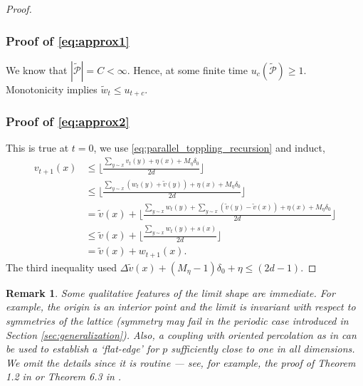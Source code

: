 \documentclass[aap]{imsart}
\newtheorem{remark}{Remark}
\begin{document}
\begin{proof}
	
	\subsubsection*{Proof of \eqref{eq:approx1}}
	We know that $|\tilde{\mathcal{P}}| = C < \infty$. Hence, at some finite time 
	$u_{c}(\tilde{\mathcal{P}}) \geq 1$. Monotonicity implies $\tilde{w}_t \leq u_{t + c}$.
	
	\subsubsection*{Proof of \eqref{eq:approx2}}
	This is true at $t = 0$, we use \eqref{eq:parallel_toppling_recursion} and induct,
	\begin{align*}
	v_{t+1}(x) &\leq \lfloor \frac{\sum_{y \sim x} v_t(y) + \eta(x) + M_{\eta}  \delta_0}{2 d } \rfloor \\
	&\leq \lfloor \frac{\sum_{y \sim x} (w_t(y) + \tilde{v}(y)) + \eta(x) + M_{\eta}  \delta_0}{2 d } \rfloor \\
	&= \tilde{v}(x) + \lfloor \frac{\sum_{y \sim x} w_t(y) +  \sum_{y \sim x} (\tilde{v}(y) - \tilde{v}(x)) + \eta(x) + M_{\eta}  \delta_0}{2 d } \rfloor \\
	&\leq \tilde{v}(x) + \lfloor \frac{\sum_{y \sim x} w_t(y) +  s(x)}{2 d } \rfloor \\
	&= \tilde{v}(x) + w_{t+1}(x).
	\end{align*}
	The third inequality used $\Delta \tilde{v}(x) + (M_{\eta} - 1)  \delta_0 + \eta \leq (2 d -1)$.
	
	
	
	
	
	
	
\end{proof}


\begin{remark}
	Some qualitative features of the limit shape are immediate. For example, the origin is an interior point and the limit 
	is invariant with respect to symmetries of the lattice (symmetry may fail in the periodic case introduced in Section \ref{sec:generalization}).	
	Also, a coupling with oriented percolation as in \cite{durrett1981shape, marchand2002strict} can be used to establish a `flat-edge' 
	for $p$ sufficiently close to one in all dimensions. We omit the details since it is routine --- see, for example, the proof of Theorem 1.2 in \cite{alves2002shape} or Theorem 6.3 in \cite{garet2004asymptotic}.
\end{remark}
\end{document}

